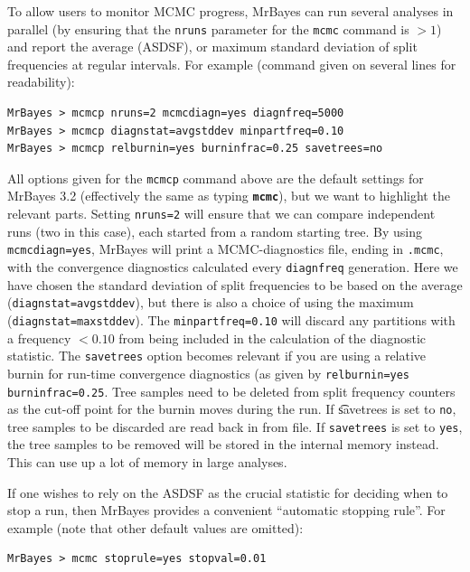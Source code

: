 \documentclass[12pt]{book}
\newcommand{\ttt}[1]{\texttt{#1}}
\newcommand{\tb}[1]{\ttt{\textbf{#1}}}
\begin{document}
To allow users to monitor MCMC progress, MrBayes can run several analyses in parallel (by ensuring
that the \ttt{nruns} parameter for the \ttt{mcmc} command is $>1$) and report the average (ASDSF),
or maximum standard deviation of split frequencies at regular intervals. For example (command given
on several lines for readability):

\small
\begin{singlespacing}
\begin{verbatim}
MrBayes > mcmcp nruns=2 mcmcdiagn=yes diagnfreq=5000
MrBayes > mcmcp diagnstat=avgstddev minpartfreq=0.10
MrBayes > mcmcp relburnin=yes burninfrac=0.25 savetrees=no
\end{verbatim}
\end{singlespacing}
\normalsize

All options given for the \ttt{mcmcp} command above are the default settings for MrBayes 3.2
(effectively the same as typing \tb{mcmc}), but we want to highlight the relevant parts. Setting
\ttt{nruns=2} will ensure that we can compare independent runs (two in this case), each started
from a random starting tree. By using \ttt{mcmcdiagn=yes}, MrBayes will print a MCMC-diagnostics
file, ending in \ttt{.mcmc}, with the convergence diagnostics calculated every \ttt{diagnfreq}
generation. Here we have chosen the standard deviation of split frequencies to be based on the
average (\ttt{diagnstat=avgstddev}), but there is also a choice of using the maximum
(\ttt{diagnstat=maxstddev}). The \ttt{minpartfreq=0.10} will discard any partitions with a
frequency $<0.10$ from being included in the calculation of the diagnostic statistic. The
\ttt{savetrees} option becomes relevant if you are using a relative burnin for run-time convergence
diagnostics (as given by \ttt{relburnin=yes burninfrac=0.25}. Tree samples need to be deleted from
split frequency counters as the cut-off point for the burnin moves during the run. If \t{savetrees}
is set to \ttt{no}, tree samples to be discarded are read back in from file. If \ttt{savetrees} is
set to \ttt{yes}, the tree samples to be removed will be stored in the internal memory instead.
This can use up a lot of memory in large analyses.

If one wishes to rely on the ASDSF as the crucial statistic for deciding when to stop a run, then
MrBayes provides a convenient ``automatic stopping rule''. For example (note that other default
values are omitted):

\small
\begin{singlespacing}
\begin{verbatim}
MrBayes > mcmc stoprule=yes stopval=0.01
\end{verbatim}
\end{singlespacing}
\normalsize
\end{document}

